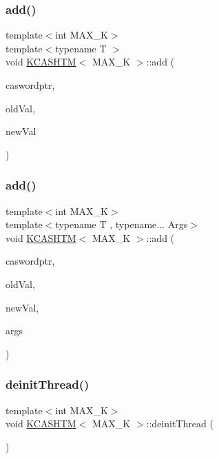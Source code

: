 \subsubsection{\texorpdfstring{add()}{add()}\hspace{0.1cm}{\footnotesize\ttfamily [1/2]}}
{\footnotesize\ttfamily template$<$int M\+A\+X\+\_\+K$>$ \\
template$<$typename T $>$ \\
void \hyperlink{classKCASHTM}{K\+C\+A\+S\+H\+TM}$<$ M\+A\+X\+\_\+K $>$\+::add (\begin{DoxyParamCaption}\item[{\hyperlink{structcasword}{casword}$<$ T $>$ $\ast$}]{caswordptr,  }\item[{T}]{old\+Val,  }\item[{T}]{new\+Val }\end{DoxyParamCaption})}

\mbox{\label{classKCASHTM_a4d983dc96331215e5328e2bacc5074e2}} 
\subsubsection{\texorpdfstring{add()}{add()}\hspace{0.1cm}{\footnotesize\ttfamily [2/2]}}
{\footnotesize\ttfamily template$<$int M\+A\+X\+\_\+K$>$ \\
template$<$typename T , typename... Args$>$ \\
void \hyperlink{classKCASHTM}{K\+C\+A\+S\+H\+TM}$<$ M\+A\+X\+\_\+K $>$\+::add (\begin{DoxyParamCaption}\item[{\hyperlink{structcasword}{casword}$<$ T $>$ $\ast$}]{caswordptr,  }\item[{T}]{old\+Val,  }\item[{T}]{new\+Val,  }\item[{Args...}]{args }\end{DoxyParamCaption})}

\mbox{\label{classKCASHTM_a1e8db0d4b5f85d6ebdfcb3615ca901a9}} 
\subsubsection{\texorpdfstring{deinit\+Thread()}{deinitThread()}}
{\footnotesize\ttfamily template$<$int M\+A\+X\+\_\+K$>$ \\
void \hyperlink{classKCASHTM}{K\+C\+A\+S\+H\+TM}$<$ M\+A\+X\+\_\+K $>$\+::deinit\+Thread (\begin{DoxyParamCaption}{ }\end{DoxyParamCaption})}

